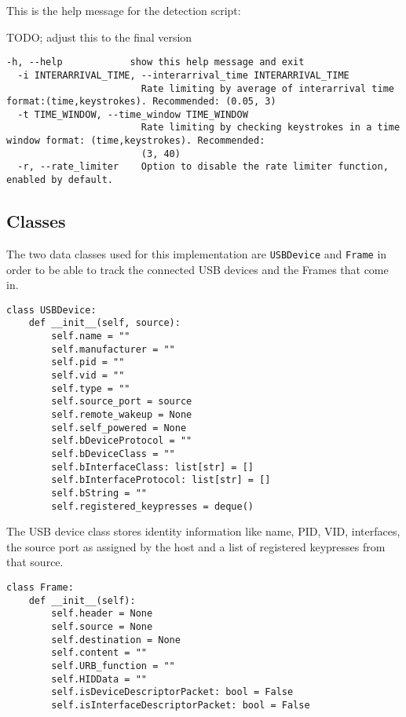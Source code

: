 This is the help message for the detection script:

 TODO; adjust this to the final version
\begin{lstlisting}[caption={Defense Script Help Message },captionpos=b]
  -h, --help            show this help message and exit
  -i INTERARRIVAL_TIME, --interarrival_time INTERARRIVAL_TIME
                        Rate limiting by average of interarrival time format:(time,keystrokes). Recommended: (0.05, 3)
  -t TIME_WINDOW, --time_window TIME_WINDOW
                        Rate limiting by checking keystrokes in a time window format: (time,keystrokes). Recommended:
                        (3, 40)
  -r, --rate_limiter    Option to disable the rate limiter function, enabled by default.
\end{lstlisting}



\subsection{Classes}

The two data classes used for this implementation are \verb|USBDevice| and \verb|Frame| in order to be able to track the connected USB devices and the Frames that come in.

\begin{lstlisting}[caption={USBDevice class definition},captionpos=b]
class USBDevice:
    def __init__(self, source):
        self.name = ""
        self.manufacturer = ""
        self.pid = ""
        self.vid = ""
        self.type = ""
        self.source_port = source
        self.remote_wakeup = None
        self.self_powered = None
        self.bDeviceProtocol = ""
        self.bDeviceClass = ""
        self.bInterfaceClass: list[str] = []
        self.bInterfaceProtocol: list[str] = []
        self.bString = ""
        self.registered_keypresses = deque()
\end{lstlisting}

The USB device class stores identity information like name, PID, VID, interfaces, the source port as assigned by the host and a list of registered keypresses from that source.

\begin{lstlisting}[caption={Frame class definition},captionpos=b]
class Frame:
    def __init__(self):
        self.header = None
        self.source = None
        self.destination = None
        self.content = ""
        self.URB_function = ""
        self.HIDData = ""
        self.isDeviceDescriptorPacket: bool = False
        self.isInterfaceDescriptorPacket: bool = False
\end{lstlisting}

